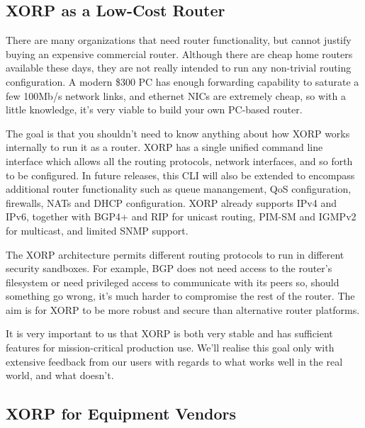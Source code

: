 \subsection{XORP as a Low-Cost Router}

There are many organizations that need router functionality, but
cannot justify buying an expensive commercial router.  Although there
are cheap home routers available these days, they are not really
intended to run any non-trivial routing configuration.  A modern \$300
PC has enough forwarding capability to saturate a few 100Mb/s network
links, and ethernet NICs are extremely cheap, so with a little
knowledge, it's very viable to build your own PC-based router.

The goal is that you shouldn't need to know anything about how XORP
works internally to run it as a router.  XORP has a single unified
command line interface which allows all the routing protocols, network
interfaces, and so forth to be configured.  In future releases, this
CLI will also be extended to encompass additional router functionality
such as queue manangement, QoS configuration, firewalls, NATs and DHCP
configuration. XORP already supports IPv4 and IPv6, together with BGP4+ and RIP for
unicast routing, PIM-SM and IGMPv2 for multicast, and limited SNMP
support.  


The XORP architecture permits different
routing protocols to run in different security sandboxes.  For
example, BGP does not need access to the router's filesystem or need
privileged access to communicate with its peers so, should something
go wrong, it's much harder to compromise the rest of the router.  The
aim is for XORP to be more robust and secure than alternative router
platforms.

It is very important to us that XORP is both very stable and has
sufficient features for mission-critical production use.  We'll
realise this goal only with extensive feedback from our users with
regards to what works well in the real world, and what doesn't.


\subsection{XORP for Equipment Vendors}

